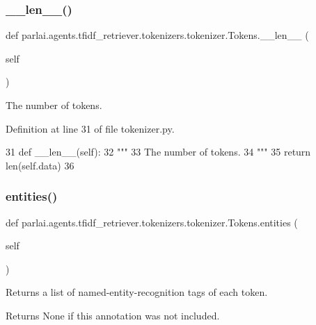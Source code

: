\subsubsection{\texorpdfstring{\+\_\+\+\_\+len\+\_\+\+\_\+()}{\_\_len\_\_()}}
{\footnotesize\ttfamily def parlai.\+agents.\+tfidf\+\_\+retriever.\+tokenizers.\+tokenizer.\+Tokens.\+\_\+\+\_\+len\+\_\+\+\_\+ (\begin{DoxyParamCaption}\item[{}]{self }\end{DoxyParamCaption})}

\begin{DoxyVerb}The number of tokens.
\end{DoxyVerb}
 

Definition at line 31 of file tokenizer.\+py.


\begin{DoxyCode}
31     \textcolor{keyword}{def }\_\_len\_\_(self):
32         \textcolor{stringliteral}{"""}
33 \textcolor{stringliteral}{        The number of tokens.}
34 \textcolor{stringliteral}{        """}
35         \textcolor{keywordflow}{return} len(self.data)
36 
\end{DoxyCode}
\mbox{\label{classparlai_1_1agents_1_1tfidf__retriever_1_1tokenizers_1_1tokenizer_1_1Tokens_ab5d74ebfda5597b48f1ddc5f607292de}} 
\subsubsection{\texorpdfstring{entities()}{entities()}}
{\footnotesize\ttfamily def parlai.\+agents.\+tfidf\+\_\+retriever.\+tokenizers.\+tokenizer.\+Tokens.\+entities (\begin{DoxyParamCaption}\item[{}]{self }\end{DoxyParamCaption})}

\begin{DoxyVerb}Returns a list of named-entity-recognition tags of each token.

Returns None if this annotation was not included.
\end{DoxyVerb}
 

